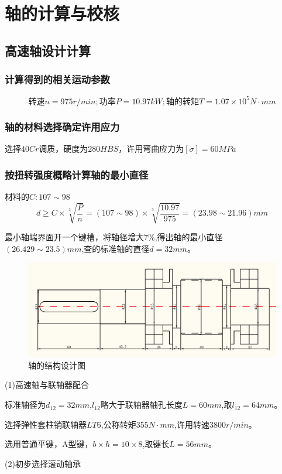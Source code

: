 \section{轴的计算与校核}
\subsection{高速轴设计计算}
\subsubsection{计算得到的相关运动参数}
    \[
        转速 n = 975r/min;功率 P =10.97kW;轴的转矩T=1.07\times 10^5 N\cdot mm
    \]
\subsubsection{轴的材料选择确定许用应力}
    选择$40Cr$调质，硬度为$280HBS$，许用弯曲应力为$[\sigma]=60MPa$
\subsubsection{按扭转强度概略计算轴的最小直径}
    材料的$C:107\sim 98$
    \[
        d \geq C\times \sqrt[3]{\frac{P}{n}}=(107\sim 98)\times \sqrt[3]{\frac{10.97}{975}}=(23.98\sim 21.96)mm
        \]

    最小轴端界面开一个键槽，将轴径增大$7\%$,得出轴的最小直径$(26.429\sim 23.5)mm$,查的标准轴的直径$d=32mm$。
\begin{figure}[h]
    \centering
    \includegraphics[scale=0.5]{graphic/5-1.png}
    \caption{轴的结构设计图}
\end{figure}

(1)高速轴与联轴器配合

标准轴径为$d_{12}=32mm$,$l_{12}$略大于联轴器轴孔长度$L=60mm$,取$l_{12}=64mm$。

选择弹性套柱销联轴器$LT6$,公称转矩$355N\cdot mm$,许用转速$3800r/min$。

选用普通平键，A型键，$b\times h=10\times 8$,取键长$L=56mm$。

(2)初步选择滚动轴承

